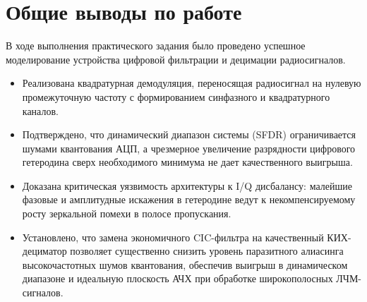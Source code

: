 \section*{Общие выводы по работе}
В ходе выполнения практического задания было проведено успешное моделирование устройства цифровой фильтрации и децимации радиосигналов. 
\begin{itemize}
    \item Реализована квадратурная демодуляция, переносящая радиосигнал на нулевую промежуточную частоту с формированием синфазного и квадратурного каналов.
    \item Подтверждено, что динамический диапазон системы (SFDR) ограничивается шумами квантования АЦП, а чрезмерное увеличение разрядности цифрового гетеродина сверх необходимого минимума не дает качественного выигрыша.
    \item Доказана критическая уязвимость архитектуры к I/Q дисбалансу: малейшие фазовые и амплитудные искажения в гетеродине ведут к некомпенсируемому росту зеркальной помехи в полосе пропускания.
    \item Установлено, что замена экономичного CIC-фильтра на качественный КИХ-дециматор позволяет существенно снизить уровень паразитного алиасинга высокочастотных шумов квантования, обеспечив выигрыш в динамическом диапазоне и идеальную плоскость АЧХ при обработке широкополосных ЛЧМ-сигналов.
\end{itemize}